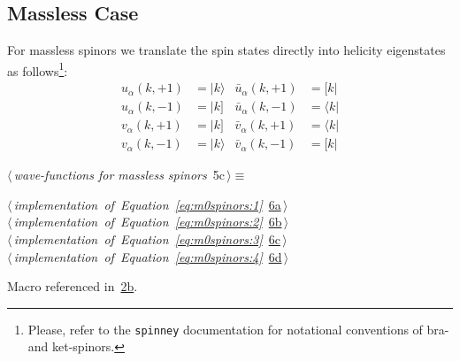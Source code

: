 \documentclass[a4paper,12pt]{amsart}
\newcommand{\bra}[1]{\langle #1 \vert}
\newcommand{\brb}[1]{[ #1 \vert}
\newcommand{\kea}[1]{\vert #1 \rangle}
\newcommand{\keb}[1]{\vert #1 ]}
\renewcommand{\NWtarget}[2]{\hypertarget{#1}{#2}}
\renewcommand{\NWlink}[2]{\hyperlink{#1}{#2}}
\renewcommand{\NWtxtMacroRefIn}{Macro referenced in}
\renewcommand{\NWsep}{${\diamond}$}
\begin{document}
\subsection{Massless Case}
For massless spinors we translate the spin states directly into
helicity eigenstates as follows\footnote{Please, refer to the
\texttt{spinney} documentation for notational conventions of
bra- and ket-spinors.}:
\begin{subequations}
\begin{align}
u_\alpha(k, +1) &= \kea{k} & \bar{u}_\alpha(k, +1) &= \brb{k}
\label{eq:m0spinors:1}\\
u_\alpha(k, -1) &= \keb{k} & \bar{u}_\alpha(k, -1) &= \bra{k}
\label{eq:m0spinors:2}\\
v_\alpha(k, +1) &= \keb{k} & \bar{v}_\alpha(k, +1) &= \bra{k}
\label{eq:m0spinors:3}\\
v_\alpha(k, -1) &= \kea{k} & \bar{v}_\alpha(k, -1) &= \brb{k}
\label{eq:m0spinors:4}
\end{align}
\end{subequations}
\begin{flushleft} \small
\begin{minipage}{\linewidth}\label{scrap8}\raggedright\small
\NWtarget{nuweb5c}{} $\langle\,${\itshape wave-functions for massless spinors}\nobreak\ {\footnotesize {5c}}$\,\rangle\equiv$
\vspace{-1ex}
\begin{list}{}{} \item
\mbox{}\verb@@\hbox{$\langle\,${\itshape implementation of Equation~\eqref{eq:m0spinors:1}}\nobreak\ {\footnotesize \NWlink{nuweb6a}{6a}}$\,\rangle$}\verb@@\\
\mbox{}\verb@@\hbox{$\langle\,${\itshape implementation of Equation~\eqref{eq:m0spinors:2}}\nobreak\ {\footnotesize \NWlink{nuweb6b}{6b}}$\,\rangle$}\verb@@\\
\mbox{}\verb@@\hbox{$\langle\,${\itshape implementation of Equation~\eqref{eq:m0spinors:3}}\nobreak\ {\footnotesize \NWlink{nuweb6c}{6c}}$\,\rangle$}\verb@@\\
\mbox{}\verb@@\hbox{$\langle\,${\itshape implementation of Equation~\eqref{eq:m0spinors:4}}\nobreak\ {\footnotesize \NWlink{nuweb6d}{6d}}$\,\rangle$}\verb@@{\NWsep}
\end{list}
\vspace{-1.5ex}
\footnotesize
\begin{list}{}{\setlength{\itemsep}{-\parsep}\setlength{\itemindent}{-\leftmargin}}
\item \NWtxtMacroRefIn\ \NWlink{nuweb2b}{2b}.

\item{}
\end{list}
\end{minipage}\vspace{4ex}
\end{flushleft}
\end{document}
